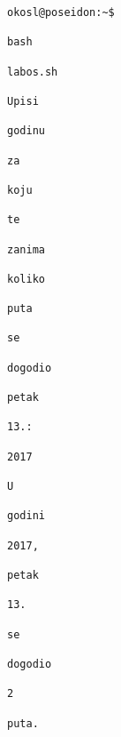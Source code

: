 \documentclass{exam}
\begin{document}
\begin{itemize}
                                                                                                    \begin{lstlisting}[caption={Ispis}]
                                                                                                    okosl@poseidon:~$
                                                                                                    bash
                                                                                                    labos.sh 
                                                                                                    Upisi
                                                                                                    godinu
                                                                                                    za
                                                                                                    koju
                                                                                                    te
                                                                                                    zanima
                                                                                                    koliko
                                                                                                    puta
                                                                                                    se
                                                                                                    dogodio
                                                                                                    petak
                                                                                                    13.:
                                                                                                    2017
                                                                                                    U
                                                                                                    godini
                                                                                                    2017,
                                                                                                    petak
                                                                                                    13.
                                                                                                    se
                                                                                                    dogodio
                                                                                                    2
                                                                                                    puta.


\end{lstlisting}
\end{itemize}
\end{document}
